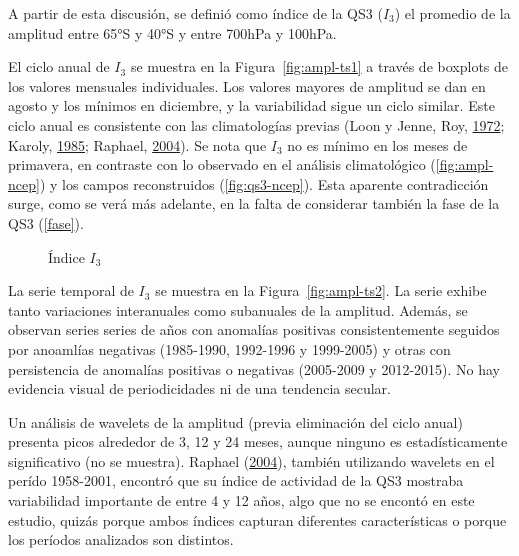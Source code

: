 \documentclass[spanish,a4paper,12pt]{book}
\begin{document}
A partir de esta discusión, se definió como índice de la QS3 (\(I_3\))
el promedio de la amplitud entre 65°S y 40°S y entre 700hPa y 100hPa.

El ciclo anual de \(I_3\) se muestra en la Figura~\ref{fig:ampl-ts1} a
través de boxplots de los valores mensuales individuales. Los valores
mayores de amplitud se dan en agosto y los mínimos en diciembre, y la
variabilidad sigue un ciclo similar. Este ciclo anual es consistente con
las climatologías previas (Loon y Jenne, Roy,
\protect\hyperlink{ref-Loon1972}{1972}; Karoly,
\protect\hyperlink{ref-Karoly1985}{1985}; Raphael,
\protect\hyperlink{ref-Raphael2004}{2004}). Se nota que \(I_3\) no es
mínimo en los meses de primavera, en contraste con lo observado en el
análisis climatológico (\autoref{fig:ampl-ncep}) y los campos
reconstruidos (\autoref{fig:qs3-ncep}). Esta aparente contradicción
surge, como se verá más adelante, en la falta de considerar también la
fase de la QS3 (\autoref{fase}).

\begin{figure*}
\newline{}\caption{Índice $I_3$}\label{fig:ampl-ts}
\end{figure*}

La serie temporal de \(I_3\) se muestra en la Figura~\ref{fig:ampl-ts2}.
La serie exhibe tanto variaciones interanuales como subanuales de la
amplitud. Además, se observan series series de años con anomalías
positivas consistentemente seguidos por anoamlías negativas (1985-1990,
1992-1996 y 1999-2005) y otras con persistencia de anomalías positivas o
negativas (2005-2009 y 2012-2015). No hay evidencia visual de
periodicidades ni de una tendencia secular.

Un análisis de wavelets de la amplitud (previa eliminación del ciclo
anual) presenta picos alrededor de 3, 12 y 24 meses, aunque ninguno es
estadísticamente significativo (no se muestra). Raphael
(\protect\hyperlink{ref-Raphael2004}{2004}), también utilizando wavelets
en el perído 1958-2001, encontró que su índice de actividad de la QS3
mostraba variabilidad importante de entre 4 y 12 años, algo que no se
encontó en este estudio, quizás porque ambos índices capturan diferentes
características o porque los períodos analizados son distintos.
\end{document}

